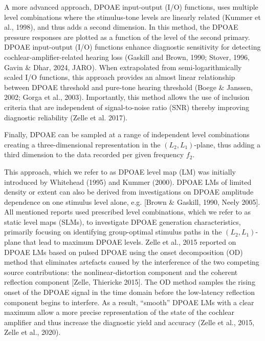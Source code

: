 \documentclass[journal,twoside,web]{ieeecolor2}
\begin{document}
A more advanced approach, DPOAE input-output (I/O) functions, uses multiple level combinations where the stimulus-tone levels are linearly related (Kummer et al., 1998), and thus adds a second dimension.
In this method, the DPOAE pressure responses are plotted as a function of the level of the second primary.
DPOAE input-output (I/O) functions enhance diagnostic sensitivity for detecting cochlear-amplifier-related hearing loss (Gaskill and Brown, 1990; Stover, 1996, Gavin \& Dhar, 2024, JARO).
When extrapolated from semi-logarithmically scaled I/O functions, this approach provides an almost linear relationship between DPOAE threshold and pure-tone hearing threshold (Boege \& Janssen, 2002; Gorga et al., 2003).
Importantly, this method allows the use of inclusion criteria that are independent of signal-to-noise ratio (SNR) thereby improving diagnostic reliability (Zelle et al. 2017).

Finally, DPOAE can be sampled at a range of independent level combinations creating a three-dimensional representation in the $(L_2, L_1)$-plane, thus adding a third dimension to the data recorded per given frequency $f_2$.
 
This approach, which we refer to as DPOAE level map (LM) was initially introduced by Whitehead (1995) and Kummer (2000).
DPOAE LMs of limited density or extent can also be derived from investigations on DPOAE amplitude dependence on one stimulus level alone, e.g. [Brown \& Gaskill, 1990, Neely 2005].
All mentioned reports used prescribed level combinations, which we refer to as static level maps (SLMs), to investigate DPOAE generation characteristics, primarily focusing on identifying group-optimal stimulus paths in the $(L_2, L_1)$-plane that lead to maximum DPOAE levels.
Zelle et al., 2015 reported on DPOAE LMs based on pulsed DPOAE using the onset decomposition (OD) method that eliminates artefacts caused by the interference of the two competing source contributions: the nonlinear-distortion component and the coherent reflection component [Zelle, Thiericke 2015].
The OD method samples the rising onset of the DPOAE signal in the time domain before the low-latency reflection component begins to interfere.
As a result, “smooth” DPOAE LMs with a clear maximum allow a more precise representation of the state of the cochlear amplifier and thus increase the diagnostic yield and accuracy (Zelle et al., 2015, Zelle et al., 2020).
\end{document}
